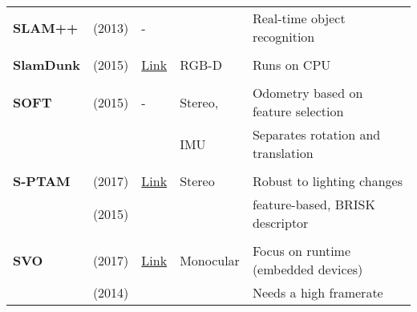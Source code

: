 \documentclass[a4paper,12pt]{scrartcl}
\begin{document}
{\begin{longtable}{l|l|l|l|l}
    \textbf{SLAM++}        & \cite{Salas-moreno2013} (2013)    & -                                                                  &                       & Real-time object recognition\\
                           &                                   &                                                                    &                       &\\
    \textbf{SlamDunk}      & \cite{Fioraio2015} (2015)         & {\href{https://github.com/m4nh/skimap_ros}{Link}}                  & RGB-D                 & Runs on CPU\\
                           &                                   &                                                                    &                       &\\
    \textbf{SOFT}          & \cite{Cvisic2015} (2015)          & -                                                                  & Stereo,               & Odometry based on feature selection\\
                           &                                   &                                                                    & IMU                   & Separates rotation and translation\\
                           &                                   &                                                                    &                       &\\
    \textbf{S-PTAM}        & \cite{Pire2017} (2017)            & {\href{https://github.com/lrse/sptam}{Link}}                       & Stereo                & Robust to lighting changes\\
                           & \cite{Pire2015} (2015)            &                                                                    &                       & feature-based, BRISK descriptor\\
                           &                                   &                                                                    &                       &\\
    \textbf{SVO}           & \cite{Forster2017} (2017)         & {\href{https://github.com/uzh-rpg/rpg_svo}{Link}}                  & Monocular             & Focus on runtime (embedded devices)\\
                           & \cite{Forster2014a} (2014)        &                                                                    &                       & Needs a high framerate\\

\end{longtable}}
\end{document}
